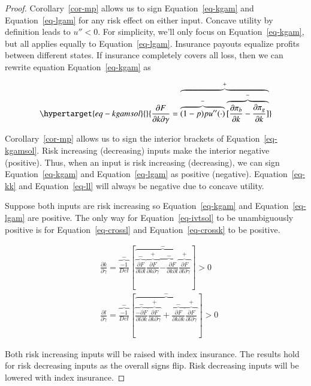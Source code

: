 \documentclass[
  super,
  preprint,
  3p]{elsarticle}
\theoremstyle{plain}
\theoremstyle{plain}
\theoremstyle{remark}
\begin{document}
\begin{proof}

Corollary~\ref{cor-mp} allows us to sign Equation~\ref{eq-kgam} and
Equation~\ref{eq-lgam} for any risk effect on either input. Concave
utility by definition leads to \(u''<0\). For simplicity, we'll only
focus on Equation~\ref{eq-kgam}, but all applies equally to
Equation~\ref{eq-lgam}. Insurance payouts equalize profits between
different states. If insurance completely covers all loss, then we can
rewrite equation Equation~\ref{eq-kgam} as

\begin{equation}\protect\hypertarget{eq-kgamsol}{}{
\frac{\partial F}{\partial k \partial \gamma}=\overbrace{\overbrace{(1-p)pu''(\cdot)}^{-}\overbrace{[\frac{\partial \pi_b}{\partial k}-\frac{\partial \pi_g}{\partial k}]}^{-}}^{+}
}\label{eq-kgamsol}\end{equation}

Corollary~\ref{cor-mp} allows us to sign the interior brackets of
Equation~\ref{eq-kgamsol}. Risk increasing (decreasing) inputs make the
interior negative (positive). Thus, when an input is risk increasing
(decreasing), we can sign Equation~\ref{eq-kgam} and
Equation~\ref{eq-lgam} as positive (negative). Equation~\ref{eq-kk} and
Equation~\ref{eq-ll} will always be negative due to concave utility.

Suppose both inputs are risk increasing so Equation~\ref{eq-kgam} and
Equation~\ref{eq-lgam} are positive. The only way for
Equation~\ref{eq-ivtsol} to be unambiguously positive is for
Equation~\ref{eq-crossl} and Equation~\ref{eq-crossk} to be positive.

\[
\begin{aligned}
&\frac{\partial k}{\partial \gamma}=\overbrace{\frac{-1}{Det}}^{-}\left[\overbrace{\overbrace{\frac{\partial F}{\partial l \partial l}}^{-}\overbrace{\frac{\partial F}{\partial k \partial \gamma}}^{+}\overbrace{-\frac{\partial F}{\partial k \partial l}}^{-}\overbrace{\frac{\partial F}{\partial l \partial \gamma}}^{+}}^{-}\right] >0\\
&\frac{\partial l}{\partial \gamma}=\overbrace{\frac{-1}{Det}}^{-}\left[\overbrace{\overbrace{\frac{-\partial F}{\partial l \partial k}}^{-}\overbrace{\frac{\partial F}{\partial k \partial \gamma}}^{+}+\overbrace{\frac{\partial F}{\partial k \partial k}}^{-}\overbrace{\frac{\partial F}{\partial l \partial \gamma}}^{+}}^{-}\right]>0
\end{aligned}
\]

Both risk increasing inputs will be raised with index insurance. The
results hold for risk decreasing inputs as the overall signs flip. Risk
decreasing inputs will be lowered with index insurance.


\end{proof}
\end{document}
